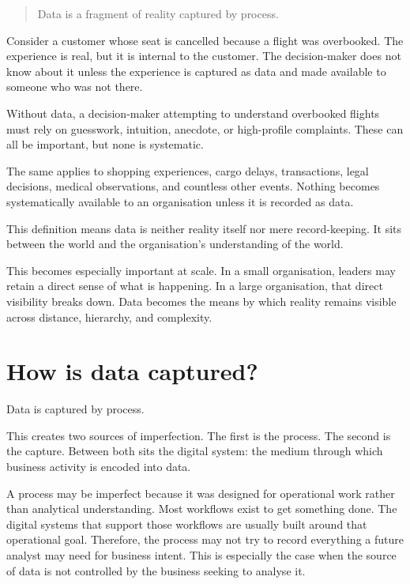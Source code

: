 \documentclass[10pt,openany,10pt]{book}
\newcounter{none}
\begin{document}
\begin{quote}
Data is a fragment of reality captured by process.
\end{quote}

Consider a customer whose seat is cancelled because a flight was
overbooked. The experience is real, but it is internal to the customer.
The decision-maker does not know about it unless the experience is
captured as data and made available to someone who was not there.

Without data, a decision-maker attempting to understand overbooked
flights must rely on guesswork, intuition, anecdote, or high-profile
complaints. These can all be important, but none is systematic.

The same applies to shopping experiences, cargo delays, transactions,
legal decisions, medical observations, and countless other events.
Nothing becomes systematically available to an organisation unless it is
recorded as data.

This definition means data is neither reality itself nor mere
record-keeping. It sits between the world and the organisation's
understanding of the world.

This becomes especially important at scale. In a small organisation,
leaders may retain a direct sense of what is happening. In a large
organisation, that direct visibility breaks down. Data becomes the means
by which reality remains visible across distance, hierarchy, and
complexity.

\section{How is data captured?}\label{how-is-data-captured}

Data is captured by process.

This creates two sources of imperfection. The first is the process. The
second is the capture. Between both sits the digital system: the medium
through which business activity is encoded into data.

A process may be imperfect because it was designed for operational work
rather than analytical understanding. Most workflows exist to get
something done. The digital systems that support those workflows are
usually built around that operational goal. Therefore, the process may
not try to record everything a future analyst may need for business
intent. This is especially the case when the source of data is not
controlled by the business seeking to analyse it.
\end{document}
